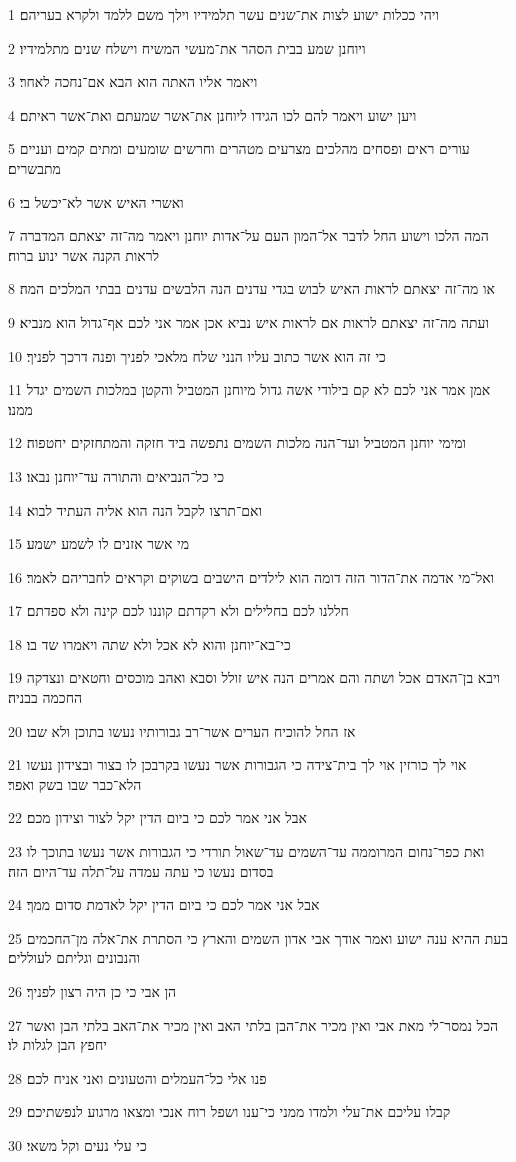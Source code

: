\par 1 ויהי ככלות ישוע לצות את־שנים עשר תלמידיו וילך משם ללמד ולקרא בעריהם׃
\par 2 ויוחנן שמע בבית הסהר את־מעשי המשיח וישלח שנים מתלמידיו׃
\par 3 ויאמר אליו האתה הוא הבא אם־נחכה לאחר׃
\par 4 ויען ישוע ויאמר להם לכו הגידו ליוחנן את־אשר שמעתם ואת־אשר ראיתם׃
\par 5 עורים ראים ופסחים מהלכים מצרעים מטהרים וחרשים שומעים ומתים קמים ועניים מתבשרים׃
\par 6 ואשרי האיש אשר לא־יכשל בי׃
\par 7 המה הלכו וישוע החל לדבר אל־המון העם על־אדות יוחנן ויאמר מה־זה יצאתם המדברה לראות הקנה אשר ינוע ברוח׃
\par 8 או מה־זה יצאתם לראות האיש לבוש בגדי עדנים הנה הלבשים עדנים בבתי המלכים המה׃
\par 9 ועתה מה־זה יצאתם לראות אם לראות איש נביא אכן אמר אני לכם אף־גדול הוא מנביא׃
\par 10 כי זה הוא אשר כתוב עליו הנני שלח מלאכי לפניך ופנה דרכך לפניך׃
\par 11 אמן אמר אני לכם לא קם בילודי אשה גדול מיוחנן המטביל והקטן במלכות השמים יגדל ממנו׃
\par 12 ומימי יוחנן המטביל ועד־הנה מלכות השמים נתפשה ביד חזקה והמתחזקים יחטפוה׃
\par 13 כי כל־הנביאים והתורה עד־יוחנן נבאו׃
\par 14 ואם־תרצו לקבל הנה הוא אליה העתיד לבוא׃
\par 15 מי אשר אזנים לו לשמע ישמע׃
\par 16 ואל־מי אדמה את־הדור הזה דומה הוא לילדים הישבים בשוקים וקראים לחבריהם לאמר׃
\par 17 חללנו לכם בחלילים ולא רקדתם קוננו לכם קינה ולא ספדתם׃
\par 18 כי־בא־יוחנן והוא לא אכל ולא שתה ויאמרו שד בו׃
\par 19 ויבא בן־האדם אכל ושתה והם אמרים הנה איש זולל וסבא ואהב מוכסים וחטאים ונצדקה החכמה בבניה׃
\par 20 אז החל להוכיח הערים אשר־רב גבורותיו נעשו בתוכן ולא שבו׃
\par 21 אוי לך כורזין אוי לך בית־צידה כי הגבורות אשר נעשו בקרבכן לו בצור ובצידון נעשו הלא־כבר שבו בשק ואפר׃
\par 22 אבל אני אמר לכם כי ביום הדין יקל לצור וצידון מכם׃
\par 23 ואת כפר־נחום המרוממה עד־השמים עד־שאול תורדי כי הגבורות אשר נעשו בתוכך לו בסדום נעשו כי עתה עמדה על־תלה עד־היום הזה׃
\par 24 אבל אני אמר לכם כי ביום הדין יקל לאדמת סדום ממך׃
\par 25 בעת ההיא ענה ישוע ואמר אודך אבי אדון השמים והארץ כי הסתרת את־אלה מן־החכמים והנבונים וגליתם לעוללים׃
\par 26 הן אבי כי כן היה רצון לפניך׃
\par 27 הכל נמסר־לי מאת אבי ואין מכיר את־הבן בלתי האב ואין מכיר את־האב בלתי הבן ואשר יחפץ הבן לגלות לו׃
\par 28 פנו אלי כל־העמלים והטעונים ואני אניח לכם׃
\par 29 קבלו עליכם את־עלי ולמדו ממני כי־ענו ושפל רוח אנכי ומצאו מרגוע לנפשתיכם׃
\par 30 כי עלי נעים וקל משאי׃

